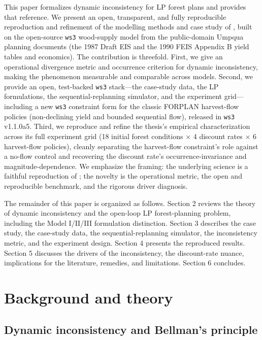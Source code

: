 \documentclass[12pt]{article}
\begin{document}
This paper formalizes dynamic inconsistency for LP forest plans and provides that reference. We present an open, transparent, and fully reproducible reproduction and refinement of the modelling methods and case study of \citet{daugherty1991credibility}, built on the open-source \texttt{ws3} wood-supply model \citep{paradis2026ws3} from the public-domain Umpqua planning documents (the 1987 Draft EIS and the 1990 FEIS Appendix B yield tables and economics). The contribution is threefold. First, we give an operational divergence metric and occurrence criterion for dynamic inconsistency, making the phenomenon measurable and comparable across models. Second, we provide an open, test-backed \texttt{ws3} stack---the case-study data, the LP formulations, the sequential-replanning simulator, and the experiment grid---including a new \texttt{ws3} constraint form for the classic FORPLAN harvest-flow policies (non-declining yield and bounded sequential flow), released in \texttt{ws3} v1.1.0a5. Third, we reproduce and refine the thesis's empirical characterization across its full experiment grid (18 initial forest conditions $\times$ 4 discount rates $\times$ 6 harvest-flow policies), cleanly separating the harvest-flow constraint's role against a no-flow control and recovering the discount rate's occurrence-invariance and magnitude-dependence. We emphasize the framing: the underlying science is a faithful reproduction of \citet{daugherty1991credibility}; the novelty is the operational metric, the open and reproducible benchmark, and the rigorous driver diagnosis.

The remainder of this paper is organized as follows. Section 2 reviews the theory of dynamic inconsistency and the open-loop LP forest-planning problem, including the Model I/II/III formulation distinction. Section 3 describes the case study, the case-study data, the sequential-replanning simulator, the inconsistency metric, and the experiment design. Section 4 presents the reproduced results. Section 5 discusses the drivers of the inconsistency, the discount-rate nuance, implications for the literature, remedies, and limitations. Section 6 concludes.

\section{Background and theory}

\hypertarget{dynamic-inconsistency-and-bellmans-principle}{%
\subsection{Dynamic inconsistency and Bellman's principle}\label{dynamic-inconsistency-and-bellmans-principle}}
\end{document}
